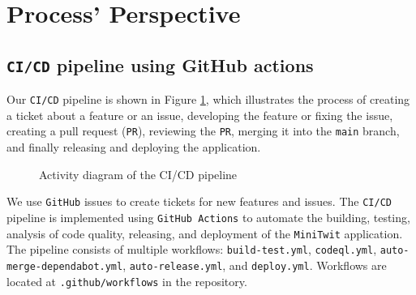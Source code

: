 \section{Process' Perspective}
\label{ch:background} 

\subsection{\texttt{CI/CD} pipeline using GitHub actions}
Our \texttt{CI/CD} pipeline is shown in Figure \ref{fig:activity_diagram}, which illustrates the process 
of creating a ticket about a feature or an issue,
developing the feature or fixing the issue, creating a pull request (\texttt{PR}),
reviewing the \texttt{PR}, merging it into the \texttt{main} branch, and finally releasing and deploying the application.
\begin{figure}[h]
      \centering
      \caption{Activity diagram of the CI/CD pipeline}
      \label{fig:activity_diagram}
\end{figure}

We use \texttt{GitHub} issues to create tickets for new features and issues.
The \texttt{CI/CD} pipeline is implemented using \texttt{GitHub Actions} to automate the
building, testing, analysis of code quality, releasing, and deployment
of the \texttt{MiniTwit} application.
The pipeline consists of multiple workflows: \texttt{build-test.yml}, \texttt{codeql.yml}, \texttt{auto-merge-dependabot.yml}, \texttt{auto-release.yml}, and \texttt{deploy.yml}. 
Workflows are located at \texttt{.github/workflows} in the repository.

